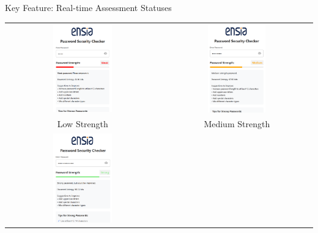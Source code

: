 \documentclass[aspectratio=169]{beamer}
\begin{document}
\begin{frame}{Key Feature: Real-time Assessment Statuses}
  \centering
  \begin{tabular}{cc}
      \includegraphics[width=0.4\textwidth]{low.png} &
      \includegraphics[width=0.4\textwidth]{medium.png} \\
      \small Low Strength & \small Medium Strength \\[1em]
      \includegraphics[width=0.4\textwidth]{strong.png} &

\end{tabular}
\end{frame}
\end{document}

